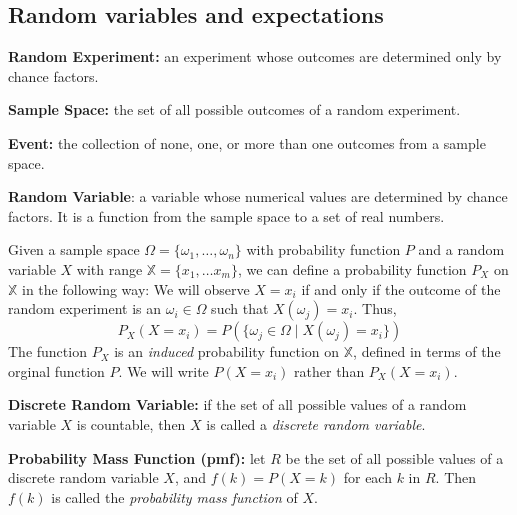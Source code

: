 \subsection{Random variables and expectations}

\begin{definition}
	\textbf{Random Experiment:} an experiment whose outcomes are determined only by chance factors.
\end{definition}

\begin{definition}
	\textbf{Sample Space:} the set of all possible outcomes of a random experiment.
\end{definition}

\begin{definition}
	\textbf{Event:} the collection of none, one, or more than one outcomes from a sample space.
\end{definition}

\begin{definition}
	\textbf{Random Variable}: a variable whose numerical values are determined by chance factors. It is a function from the sample space to a set of real numbers.
\end{definition}
Given a sample space $\Omega = \{ \omega_1, \ldots, \omega_n \}$ with probability function $P$ and a random variable $X$ with range $\mathbb{X} = \{ x_1, \ldots x_m \}$, we can define a probability function $P_X$ on $\mathbb{X}$ in the following way: We will observe $X = x_i$ if and only if the outcome of the random experiment is an $\omega_i \in \Omega$ such that $X(\omega_j) = x_i$. Thus,
\[
	P_X(X = x_i) = P(\{ \omega_j \in \Omega \mid X(\omega_j) = x_i \})
\]
The function $P_X$ is an \textit{induced} probability function on $\mathbb{X}$, defined in terms of the orginal function $P$. We will write $P(X = x_i)$ rather than $P_X(X = x_i)$.
\begin{definition}
	\textbf{Discrete Random Variable:} if the set of all possible values of a random variable $X$ is countable, then $X$ is called a \textit{discrete random variable}.
\end{definition}

\begin{definition}
	\textbf{Probability Mass Function (pmf):} let $R$ be the set of all possible values of a discrete random variable $X$, and $f(k) = P(X = k)$ for each $k$ in $R$. Then $f(k)$ is called the \textit{probability mass function} of $X$.
\end{definition}

